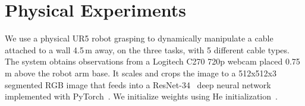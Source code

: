 \section{Physical Experiments}




We use a physical UR5 robot grasping to dynamically manipulate a cable attached to a wall 4.5\,m away, on the three tasks, with 5 different cable types.
The system obtains observations from a Logitech C270 720p webcam placed 0.75\,m above the robot arm base.  It scales and crops the image to a 512x512x3 segmented RGB image that feeds into a ResNet-34~\cite{resnets_2016} deep neural network implemented with PyTorch~\cite{pytorch_neurips}.
We initialize weights using He initialization~\cite{he2015delving}.






